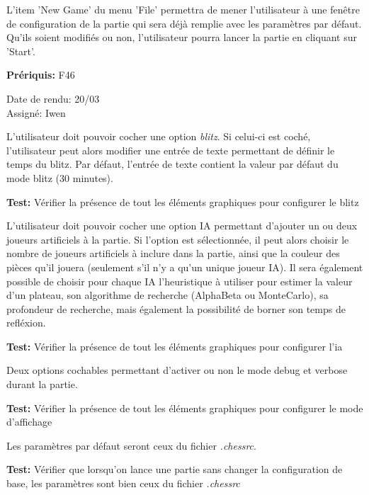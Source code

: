 \documentclass{article}
\begin{document}
\begin{needbox}
    L'item 'New Game' du menu 'File' permettra de mener l'utilisateur à une fenêtre de configuration
    de la partie qui sera déjà remplie avec les paramètres par défaut. Qu'ils soient modifiés ou
    non, l'utilisateur pourra lancer la partie en cliquant sur 'Start'. 

    \textbf{Prériquis:} F46
    \begin{duedatebox}
        Date de rendu: 20/03\\
        Assigné: Iwen
    \end{duedatebox}
    \begin{subneedbox}
        L'utilisateur doit pouvoir cocher une option \textit{blitz}.
        Si celui-ci est coché, l'utilisateur peut alors modifier une entrée
        de texte permettant de définir le temps du blitz. Par défaut, l'entrée de texte
        contient la valeur par défaut du mode blitz (30 minutes).

        \textbf{Test:} Vérifier la présence de tout les éléments graphiques pour configurer le blitz
    \end{subneedbox}
    \begin{subneedbox}
        L'utilisateur doit pouvoir cocher une option IA permettant d'ajouter
        un ou deux joueurs artificiels à la partie. Si l'option est sélectionnée,
        il peut alors choisir le nombre de joueurs artificiels à inclure dans la partie,
        ainsi que la couleur des pièces qu'il jouera (seulement s'il n'y a qu'un unique
        joueur IA).
        Il sera également possible de choisir pour chaque IA l'heuristique à utiliser pour
        estimer la valeur d'un plateau, son algorithme de recherche (AlphaBeta ou MonteCarlo),
        sa profondeur de recherche, mais également la possibilité de borner son temps de refléxion.

        \textbf{Test:} Vérifier la présence de tout les éléments graphiques pour configurer l'ia
    \end{subneedbox}
    \begin{subneedbox}
        Deux options cochables permettant d'activer ou non le mode debug et verbose
        durant la partie.

        \textbf{Test:} Vérifier la présence de tout les éléments graphiques pour configurer le mode d'affichage
    \end{subneedbox}
    \begin{subneedbox}
        Les paramètres par défaut seront ceux du fichier \textit{.chessrc}.

        \textbf{Test:} Vérifier que lorsqu'on lance une partie sans changer la configuration de base,
        les paramètres sont bien ceux du fichier \textit{.chessrc}
    \end{subneedbox}

\end{needbox}
\end{document}
